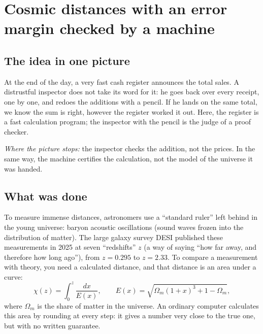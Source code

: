 \chapter[Cosmic distances, machine-checked]{Cosmic distances with an error margin checked by a machine}

\section*{The idea in one picture}

\begin{analogie}
At the end of the day, a very fast cash register announces the total sales. A distrustful inspector does not take its
word for it: he goes back over every receipt, one by one, and redoes the additions with a pencil. If he lands on the
same total, we know the sum is right, however the register worked it out. Here, the register is a fast calculation
program; the inspector with the pencil is the judge of a proof checker.

\emph{Where the picture stops:} the inspector checks the addition, not the prices. In the same way, the machine
certifies the calculation, not the model of the universe it was handed.
\end{analogie}

\section*{What was done}

To measure immense distances, astronomers use a ``standard ruler'' left behind in the young universe: baryon acoustic
oscillations (sound waves frozen into the distribution of matter). The large galaxy survey DESI published these
measurements in 2025 at seven ``redshifts'' $z$ (a way of saying ``how far away, and therefore how long ago''), from
$z=0.295$ to $z=2.33$. To compare a measurement with theory, you need a calculated distance, and that distance is an
area under a curve:
\[ \chi(z)=\int_0^z \frac{dx}{E(x)}, \qquad E(x)=\sqrt{\Omega_m(1+x)^3+1-\Omega_m}, \]
where $\Omega_m$ is the share of matter in the universe. An ordinary computer calculates this area by rounding at
every step: it gives a number very close to the true one, but with no written guarantee.

